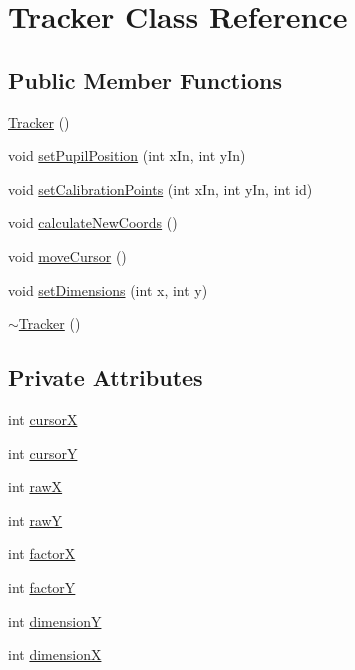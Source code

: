 \hypertarget{class_tracker}{}\section{Tracker Class Reference}
\label{class_tracker}
\subsection*{Public Member Functions}
\begin{DoxyCompactItemize}
\item 
\mbox{\hyperlink{class_tracker_adf214393a14e8bf23de2fc8231e239ec}{Tracker}} ()
\item 
void \mbox{\hyperlink{class_tracker_a46d18bb34e13db3c607929611a397df2}{set\+Pupil\+Position}} (int x\+In, int y\+In)
\item 
void \mbox{\hyperlink{class_tracker_a93d4eb33c16df57689378918ccd606a5}{set\+Calibration\+Points}} (int x\+In, int y\+In, int id)
\item 
void \mbox{\hyperlink{class_tracker_a80e4f6083c23a2bcacea30a25bbe736d}{calculate\+New\+Coords}} ()
\item 
void \mbox{\hyperlink{class_tracker_af7d25440cc04a4663a7d09052efa7190}{move\+Cursor}} ()
\item 
void \mbox{\hyperlink{class_tracker_a4757c0a8b374190c2aa41cb8e4fad132}{set\+Dimensions}} (int x, int y)
\item 
\mbox{\hyperlink{class_tracker_a0ed1e23312cfe7fcfe5f2ac2abd69163}{$\sim$\+Tracker}} ()
\end{DoxyCompactItemize}
\subsection*{Private Attributes}
\begin{DoxyCompactItemize}
\item 
int \mbox{\hyperlink{class_tracker_ae1b2c9361fa21a9736c7ae958d663315}{cursorX}}
\item 
int \mbox{\hyperlink{class_tracker_aa4d4bd44e62ea5012119e6d72d6143f5}{cursorY}}
\item 
int \mbox{\hyperlink{class_tracker_aa25c70b48f8840428e6e2abfd080acfc}{rawX}}
\item 
int \mbox{\hyperlink{class_tracker_a5d10e475635c7cfb3063ded1f85734c0}{rawY}}
\item 
int \mbox{\hyperlink{class_tracker_ad56bff4ed71f5371d9de206996dc20ba}{factorX}}
\item 
int \mbox{\hyperlink{class_tracker_a119940aac1475ea8b63ca1b4e9b40617}{factorY}}
\item 
int \mbox{\hyperlink{class_tracker_a1defe6c2a0f835d76a99b95814492975}{dimensionY}}
\item 
int \mbox{\hyperlink{class_tracker_a08f50bf17f76f0841d6611d5f9f00a2d}{dimensionX}}
\end{DoxyCompactItemize}



